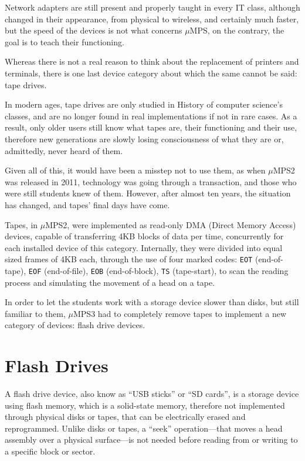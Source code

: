 \documentclass[12pt,a4paper,openright,twoside]{report}
\begin{document}
Network adapters are still present and properly taught in every IT class, although changed in their appearance, from physical to wireless, and certainly much faster, but the speed of the devices is not what concerns $\mu$MPS, on the contrary, the goal is to teach their functioning.

Whereas there is not a real reason to think about the replacement of printers and terminals, there is one last device category about which the same cannot be said: tape drives.

In modern ages, tape drives are only studied in History of computer science's classes, and are no longer found in real implementations if not in rare cases.
As a result, only older users still know what tapes are, their functioning and their use, therefore new generations are slowly losing consciousness of what they are or, admittedly, never heard of them.

Given all of this, it would have been a misstep not to use them, as when $\mu$MPS2 was released in 2011, technology was going through a transaction, and those who were still students knew of them. However, after almost ten years, the situation has changed, and tapes' final days have come.

Tapes, in $\mu$MPS2, were implemented as read-only DMA (Direct Memory Access) devices, capable of transferring 4KB blocks of data per time, concurrently for each installed device of this category.
Internally, they were divided into equal sized frames of 4KB each, through the use of four marked codes: \texttt{EOT} (end-of-tape), \texttt{EOF} (end-of-file), \texttt{EOB} (end-of-block), \texttt{TS} (tape-start), to scan the reading process and simulating the movement of a head on a tape.

In order to let the students work with a storage device slower than disks, but still familiar to them, $\mu$MPS3 had to completely remove tapes to implement a new category of devices: flash drive devices.

\section{Flash Drives}
A flash drive device, also know as ``USB sticks'' or ``SD cards'', is a storage device using flash memory, which is a solid-state memory, therefore not implemented through physical disks or tapes, that can be electrically erased and reprogrammed.
Unlike disks or tapes, a ``seek'' operation---that moves a head assembly over a physical surface---is not needed before reading from or writing to a specific block or sector.
\end{document}
